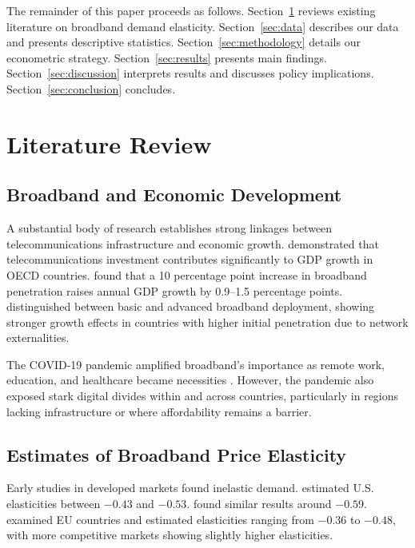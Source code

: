 \documentclass[12pt,review]{elsarticle}
\begin{document}
The remainder of this paper proceeds as follows. Section~\ref{sec:literature} reviews existing literature on broadband demand elasticity. Section~\ref{sec:data} describes our data and presents descriptive statistics. Section~\ref{sec:methodology} details our econometric strategy. Section~\ref{sec:results} presents main findings. Section~\ref{sec:discussion} interprets results and discusses policy implications. Section~\ref{sec:conclusion} concludes.

\section{Literature Review}
\label{sec:literature}

\subsection{Broadband and Economic Development}

A substantial body of research establishes strong linkages between telecommunications infrastructure and economic growth. \citet{roller1996telecommunications} demonstrated that telecommunications investment contributes significantly to GDP growth in OECD countries. \citet{czernich2011broadband} found that a 10 percentage point increase in broadband penetration raises annual GDP growth by 0.9--1.5 percentage points. \citet{koutroumpis2009impact} distinguished between basic and advanced broadband deployment, showing stronger growth effects in countries with higher initial penetration due to network externalities.

The COVID-19 pandemic amplified broadband's importance as remote work, education, and healthcare became necessities \citep{lai2020digital, beaunoyer2020covid}. However, the pandemic also exposed stark digital divides within and across countries, particularly in regions lacking infrastructure or where affordability remains a barrier.

\subsection{Estimates of Broadband Price Elasticity}

Early studies in developed markets found inelastic demand. \citet{rappoport2003residential} estimated U.S. elasticities between $-0.43$ and $-0.53$. \citet{rosston2010household} found similar results around $-0.59$. \citet{cardona2009demand} examined EU countries and estimated elasticities ranging from $-0.36$ to $-0.48$, with more competitive markets showing slightly higher elasticities.
\end{document}
